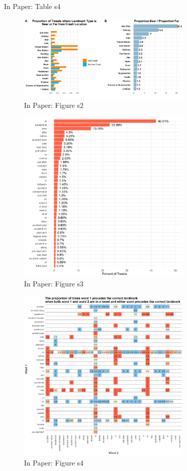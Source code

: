 \documentclass[9pt]{article}
\begin{document}
\begin{table}[H]
\caption{In Paper: Table s4}
\centering

\end{table}

\begin{figure}[H]
\centering
\includegraphics[width=0.75\textwidth]{figures/figure_s2.png}
\caption{In Paper: Figure s2}
\end{figure}

\begin{figure}[H]
\centering
\includegraphics[width=0.75\textwidth]{figures/figure_s3.png}
\caption{In Paper: Figure s3}
\end{figure}

\begin{figure}[H]
\centering
\includegraphics[width=0.75\textwidth]{figures/figure_s4.png}
\caption{In Paper: Figure s4}
\end{figure}
\end{document}
